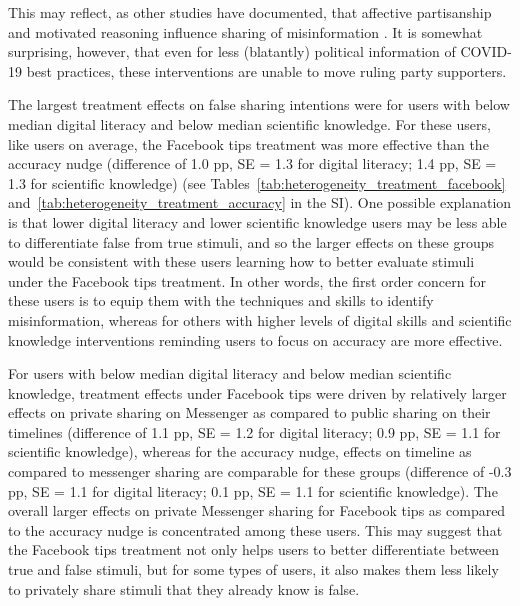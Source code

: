 \documentclass[letterpaper, 12pt, parskip=full,DIV=10]{scrartcl}
\begin{document}
This may reflect, as other studies have documented, that affective partisanship and motivated reasoning influence sharing of misinformation \citep{sanchez2021cognitive}. It is somewhat surprising, however, that even for less (blatantly) political information of COVID-19 best practices, these interventions are unable to move ruling party supporters. 

The largest treatment effects on false sharing intentions were for users with below median digital literacy and below median scientific knowledge. For these users, like users on average, the Facebook tips treatment was more effective than the accuracy nudge (difference of 1.0 pp, SE = 1.3 for digital literacy; 1.4 pp, SE = 1.3 for scientific knowledge) (see Tables~\ref{tab:heterogeneity_treatment_facebook} and~\ref{tab:heterogeneity_treatment_accuracy} in the SI). One possible explanation is that lower digital literacy and lower scientific knowledge users may be less able to differentiate false from true stimuli, and so the larger effects on these groups would be consistent with these users learning how to better evaluate stimuli under the Facebook tips treatment. In other words, the first order concern for these users is to equip them with the techniques and skills to identify misinformation, whereas for others with higher levels of digital skills and scientific knowledge interventions reminding users to focus on accuracy are more effective. 

For users with below median digital literacy and below median scientific knowledge, treatment effects under Facebook tips were driven by relatively larger effects on private sharing on Messenger as compared to public sharing on their timelines (difference of 1.1 pp, SE = 1.2 for digital literacy; 0.9 pp, SE = 1.1 for scientific knowledge), whereas for the accuracy nudge, effects on timeline as compared to messenger sharing are comparable for these groups (difference of -0.3 pp, SE = 1.1 for digital literacy; 0.1 pp, SE = 1.1 for scientific knowledge). The overall larger effects on private Messenger sharing for Facebook tips as compared to the accuracy nudge is concentrated among these users. This may suggest that the Facebook tips treatment not only helps users to better differentiate between true and false stimuli, but for some types of users, it also makes them less likely to privately share stimuli that they already know is false.
\end{document}
